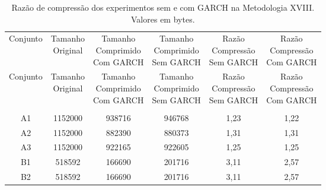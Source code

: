 \begin{center}
\begin{longtable}{cccccc}
\toprule
\rowcolor{white}
\caption[Metodologia XVIII: Razão de compressão]{Razão de compressão dos
experimentos sem e com GARCH na Metodologia XVIII.
Valores em bytes.} \label{Tab:razaocompressaoMet} \\
\midrule
Conjunto & \specialcell{Tamanho \\Original} & \specialcell{Tamanho
\\Comprimido\\Com GARCH} & \specialcell{Tamanho
\\Comprimido\\Sem GARCH} & \specialcell{Razão \\Compressão
\\Sem GARCH} & \specialcell{Razão \\Compressão
\\Com GARCH} \\
\midrule
\endfirsthead
\midrule
\rowcolor{white}
Conjunto & \specialcell{Tamanho \\Original} & \specialcell{Tamanho
\\Comprimido\\Com GARCH} & \specialcell{Tamanho
\\Comprimido\\Sem GARCH} & \specialcell{Razão \\Compressão
\\Sem GARCH} & \specialcell{Razão \\Compressão
\\Com GARCH} \\
\toprule
\endhead
\midrule \\ %
\endfoot
\bottomrule
\endlastfoot
    A1    & 1152000 & 938716 & 946768 & 1,23  & 1,22 \\
    A2    & 1152000 & 882390 & 880373 & 1,31  & 1,31 \\
    A3    & 1152000 & 922165 & 922605 & 1,25  & 1,25 \\
    B1    & 518592 & 166690 & 201716 & 3,11  & 2,57 \\
    B2    & 518592 & 166690 & 201716 & 3,11  & 2,57 \\

\end{longtable}
\end{center}
